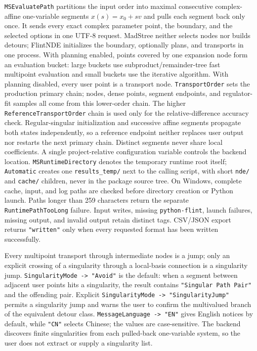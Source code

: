 \documentclass[11pt,a4paper]{article}
\begin{document}
\texttt{MSEvaluatePath} partitions the input order into maximal consecutive complex-affine
one-variable segments $x(s)=x_0+s v$ and pulls each segment back only once. It sends every
exact complex parameter point, the boundary, and the selected options in one UTF-8 request.
MadStree neither selects nodes nor builds detours; FlintNDE initializes the boundary, optionally
plans, and transports in one process. With planning enabled, points covered by one expansion
node form an evaluation bucket: large buckets use subproduct/remainder-tree fast multipoint
evaluation and small buckets use the iterative algorithm. With planning disabled, every user
point is a transport node. \texttt{TransportOrder} sets the production primary chain; nodes,
dense points, segment endpoints, and regulator-fit samples all come from this lower-order chain.
The higher \texttt{ReferenceTransportOrder} chain is used only for the relative-difference accuracy
check. Regular-singular initialization and successive affine segments propagate both states
independently, so a reference endpoint neither replaces user output nor restarts the next primary
chain. Distinct segments never share local coefficients. A single
project-relative configuration variable controls the backend location.
\texttt{MSRuntimeDirectory} denotes the temporary runtime root itself; \texttt{Automatic}
creates one \texttt{results\_temp/} next to the calling script, with short \texttt{nde/} and
\texttt{cache/} children, never in the package source tree. On Windows, complete cache,
input, and log paths are checked before directory creation or Python launch. Paths longer
than 259 characters return the separate \texttt{RuntimePathTooLong} failure. Input writes,
missing \texttt{python-flint}, launch failures, missing output, and invalid output retain
distinct tags. CSV/JSON export returns \texttt{"written"} only when every requested format
has been written successfully.

Every multipoint transport through intermediate nodes is a jump; only an explicit crossing
of a singularity through a local-basis connection is a singularity jump.
\texttt{SingularityMode -> "Avoid"} is the default: when a segment between adjacent user
points hits a singularity, the result contains \texttt{"Singular Path Pair"} and the
offending pair. Explicit \texttt{SingularityMode -> "SingularityJump"} permits a
singularity jump and warns the user to confirm the multivalued branch of the equivalent
detour class. \texttt{MessageLanguage -> "EN"} gives English notices by default, while
\texttt{"CN"} selects Chinese; the values are case-sensitive. The backend discovers finite
singularities from each pulled-back one-variable system, so the user does not extract or
supply a singularity list.
\end{document}
